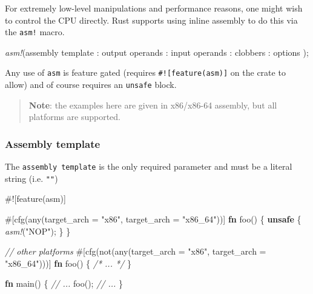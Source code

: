 \documentclass[a4paper,]{book}
\newenvironment{Shaded}{\begin{snugshade}}{\end{snugshade}}
\newcommand{\KeywordTok}[1]{\textcolor[rgb]{0.13,0.29,0.53}{\textbf{{#1}}}}
\newcommand{\StringTok}[1]{\textcolor[rgb]{0.31,0.60,0.02}{{#1}}}
\newcommand{\CommentTok}[1]{\textcolor[rgb]{0.56,0.35,0.01}{\textit{{#1}}}}
\newcommand{\PreprocessorTok}[1]{\textcolor[rgb]{0.56,0.35,0.01}{\textit{{#1}}}}
\newcommand{\AttributeTok}[1]{\textcolor[rgb]{0.77,0.63,0.00}{{#1}}}
\newcommand{\NormalTok}[1]{{#1}}
\begin{document}
For extremely low-level manipulations and performance reasons, one might
wish to control the CPU directly. Rust supports using inline assembly to
do this via the \texttt{asm!} macro.

\begin{Shaded}
\begin{Highlighting}[]
\PreprocessorTok{asm!}\NormalTok{(assembly template}
   \NormalTok{: output operands}
   \NormalTok{: input operands}
   \NormalTok{: clobbers}
   \NormalTok{: options}
   \NormalTok{);}
\end{Highlighting}
\end{Shaded}

Any use of \texttt{asm} is feature gated (requires
\texttt{\#!{[}feature(asm){]}} on the crate to allow) and of course
requires an \texttt{unsafe} block.

\begin{quote}
\textbf{Note}: the examples here are given in x86/x86-64 assembly, but
all platforms are supported.
\end{quote}

\subsubsection{Assembly template}\label{assembly-template}

The \texttt{assembly\ template} is the only required parameter and must
be a literal string (i.e. \texttt{""})

\begin{Shaded}
\begin{Highlighting}[]
\AttributeTok{#![}\NormalTok{feature}\AttributeTok{(}\NormalTok{asm}\AttributeTok{)]}

\AttributeTok{#[}\NormalTok{cfg}\AttributeTok{(}\NormalTok{any}\AttributeTok{(}\NormalTok{target_arch }\AttributeTok{=} \StringTok{"x86"}\AttributeTok{,} \NormalTok{target_arch }\AttributeTok{=} \StringTok{"x86_64"}\AttributeTok{))]}
\KeywordTok{fn} \NormalTok{foo() \{}
    \KeywordTok{unsafe} \NormalTok{\{}
        \PreprocessorTok{asm!}\NormalTok{(}\StringTok{"NOP"}\NormalTok{);}
    \NormalTok{\}}
\NormalTok{\}}

\CommentTok{// other platforms}
\AttributeTok{#[}\NormalTok{cfg}\AttributeTok{(}\NormalTok{not}\AttributeTok{(}\NormalTok{any}\AttributeTok{(}\NormalTok{target_arch }\AttributeTok{=} \StringTok{"x86"}\AttributeTok{,} \NormalTok{target_arch }\AttributeTok{=} \StringTok{"x86_64"}\AttributeTok{)))]}
\KeywordTok{fn} \NormalTok{foo() \{ }\CommentTok{/* ... */} \NormalTok{\}}

\KeywordTok{fn} \NormalTok{main() \{}
    \CommentTok{// ...}
    \NormalTok{foo();}
    \CommentTok{// ...}
\NormalTok{\}}
\end{Highlighting}
\end{Shaded}
\end{document}
